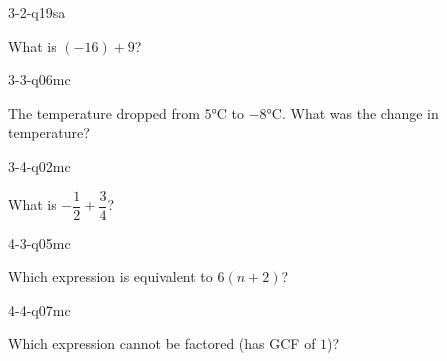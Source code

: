 \begin{practiceQuestion}{3-2-q19}{sa}
\begin{questionText}
What is $(-16) + 9$?
\end{questionText}
\end{practiceQuestion}

\begin{practiceQuestion}{3-3-q06}{mc}
\begin{questionText}
The temperature dropped from $5°$C to $-8°$C. What was the change in temperature?
\end{questionText}
\end{practiceQuestion}

\begin{practiceQuestion}{3-4-q02}{mc}
\begin{questionText}
What is $-\dfrac{1}{2} + \dfrac{3}{4}$?
\end{questionText}
\end{practiceQuestion}

\begin{practiceQuestion}{4-3-q05}{mc}
\begin{questionText}
Which expression is equivalent to $6(n + 2)$?
\end{questionText}
\end{practiceQuestion}

\begin{practiceQuestion}{4-4-q07}{mc}
\begin{questionText}
Which expression cannot be factored (has GCF of $1$)?
\end{questionText}
\end{practiceQuestion}

